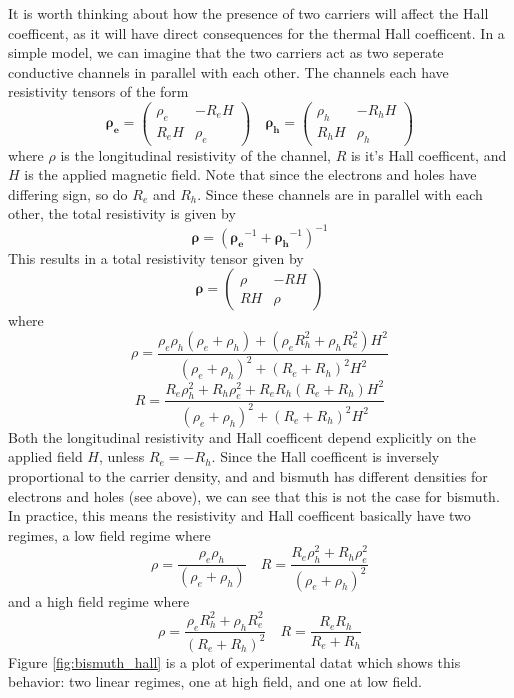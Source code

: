 \documentclass{thesis-umich}
\begin{document}
It is worth thinking about how the presence of two carriers will affect the Hall coefficent, as it will have direct consequences for the thermal Hall coefficent. In a simple model, we can imagine that the two carriers act as two seperate conductive channels in parallel with each other. The channels each have resistivity tensors of the form
\[ \mathbf{\rho_e} = \begin{pmatrix}
		\rho_e & -R_eH \\
	R_eH & \rho_e \end{pmatrix} \quad
   \mathbf{\rho_h} = \begin{pmatrix}
   		\rho_h & -R_hH \\
	R_hH & \rho_h \end{pmatrix}\]
where $\rho$ is the longitudinal resistivity of the channel, $R$ is it's Hall coefficent, and $H$ is the applied magnetic field. Note that since the electrons and holes have differing sign, so do $R_e$ and $R_h$. Since these channels are in parallel with each other, the total resistivity is given by 
\[ \mathbf{\rho} = \left(\mathbf{\rho_e}^{-1} + \mathbf{\rho_h}^{-1}\right)^{-1} \]
This results in a total resistivity tensor given by
\[ \mathbf{\rho} = \begin{pmatrix}
		\rho & -RH \\
		RH & \rho \end{pmatrix} \]
where
\[ \rho = \frac{\rho_e \rho_h(\rho_e + \rho_h) + (\rho_e R_h^2 + \rho_h R_e^2)H^2}{(\rho_e + \rho_h)^2 + (R_e + R_h)^2H^2}\]
\[ R = \frac{R_e \rho_h^2 + R_h \rho_e^2 + R_e R_h (R_e + R_h)H^2}{(\rho_e + \rho_h)^2 + (R_e + R_h)^2 H^2} \]
Both the longitudinal resistivity and Hall coefficent depend explicitly on the applied field $H$, unless $R_e = -R_h$. Since the Hall coefficent is inversely proportional to the carrier density, and and bismuth has different densities for electrons and holes (see above), we can see that this is not the case for bismuth. In practice, this means the resistivity and Hall coefficent basically have two regimes, a low field regime where
\[ \rho = \frac{\rho_e \rho_h}{(\rho_e + \rho_h)} \quad R = \frac{R_e \rho_h^2 + R_h \rho_e^2}{(\rho_e + \rho_h)^2} \]
and a high field regime where
\[ \rho = \frac{\rho_e R_h^2 + \rho_h R_e^2}{(R_e + R_h)^2} \quad R = \frac{R_e R_h}{R_e + R_h} \]
Figure \ref{fig:bismuth_hall} is a plot of experimental datat which shows this behavior: two linear regimes, one at high field, and one at low field.
\end{document}
